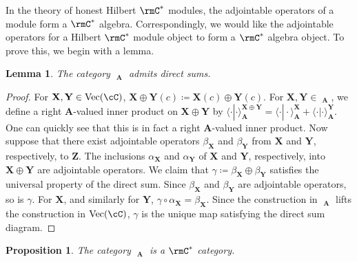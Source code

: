 \documentclass[11pt,reqno]{amsart}
\DeclareMathOperator{\Vect}{Vec}
\DeclareMathOperator{\CMod}{C^*Mod}
\newcommand{\bb}[1]{\mathbf{#1}}
\numberwithin{equation}{section}
\theoremstyle{plain}
\newtheorem{prop}[thm]{Proposition}
\newtheorem{lemma}[thm]{Lemma}
\begin{document}
In the theory of honest Hilbert $\rmC^*$ modules, the adjointable operators of a module form a $\rmC^*$ algebra.
Correspondingly, we would like the adjointable operators for a Hilbert $\rmC^*$ module object to form a $\rmC^*$ algebra object.
To prove this, we begin with a lemma.

\begin{lemma} \label{lem:directsums} 
The category $\CMod_{\bb A}$ admits direct sums.
\end{lemma}

\begin{proof}
For $\bb X, \bb Y \in \Vect(\cC)$, $\bb X \oplus \bb Y(c) \coloneq \bb X(c) \oplus \bb Y(c)$.
For $\bb X, \bb Y \in \CMod_{\bb A}$, we define a right $\bb A$-valued inner product on $\bb X \oplus \bb Y$ by $\langle \cdot | \cdot \rangle_{\bb A}^{\bb X \oplus \bb Y} = \langle \cdot | \cdot \rangle_{\bb A}^{\bb X} + \langle \cdot | \cdot \rangle_{\bb A}^{\bb Y}$.
One can quickly see that this is in fact a right $\bb A$-valued inner product.
Now suppose that there exist adjointable operators $\beta_{\bb X}$ and $\beta_{\bb Y}$ from $\bb X$ and $\bb Y$, respectively, to $\bb Z$.
The inclusions $\alpha_{\bb X}$ and $\alpha_{\bb Y}$ of $\bb X$ and $\bb Y$, respectively, into $\bb X \oplus \bb Y$ are adjointable operators.
We claim that $\gamma \coloneq \beta_{\bb X} \oplus \beta_{\bb Y}$ satisfies the universal property of the direct sum.
Since $\beta_{\bb X}$ and $\beta_{\bb Y}$ are adjointable operators, so is $\gamma$.
For $\bb X$, and similarly for $\bb Y$, $\gamma \circ \alpha_{\bb X} = \beta_{\bb X}$.
Since the construction in $\CMod_{\bb A}$ lifts the construction in $\Vect(\cC)$, $\gamma$ is the unique map satisfying the direct sum diagram.
\end{proof}

\begin{prop} \label{prop:adjopcstar}
The category $\CMod_{\bb A}$ is a $\rmC^*$ category.
\end{prop}
\end{document}
